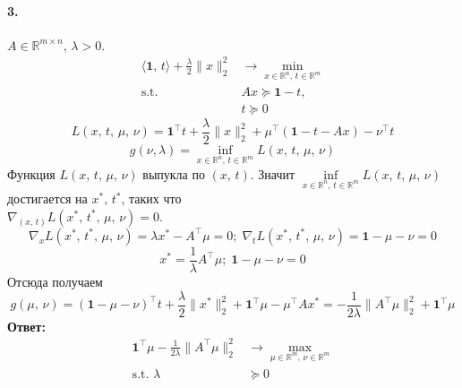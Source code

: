 \documentclass{article}
\newcommand*{\R}{\mathbb{R}}
\newcommand*{\st}{\text{s.t. }}
\newcommand*{\1}{\mathbf{1}}
\begin{document}
\paragraph{3.} $ A \in \R^{m \times n},\, \lambda > 0. $
\[ \begin{split}
    \langle \1,\, t \rangle + \frac{\lambda}{2} \|x\|_2^2 &\to \min\limits_{x \in \R^n,\, t \in \R^m} \\
    \st & Ax \succeq \1 - t, \\
    & t \succeq 0
\end{split} \]
\[ L(x,\, t,\, \mu,\, \nu) = \1^\top t + \frac{\lambda}{2} \|x\|_2^2 + \mu^\top \left( \1 - t - Ax \right) - \nu^\top t \]
\[ g(\nu, \lambda) = \inf\limits_{x \in \R^n,\, t \in \R^m} L(x,\, t,\, \mu,\, \nu) \]
Функция $L(x,\, t,\, \mu,\, \nu)$ выпукла по $(x,\, t)$. Значит $\inf\limits_{x \in \R^n,\, t \in \R^m} L(x,\, t,\, \mu,\, \nu)$ достигается на $x^\ast,\, t^\ast$, таких что \\ $\nabla_{(x,\, t)} L(x^\ast,\, t^\ast,\, \mu,\, \nu) = 0$.
\[ \nabla_x L(x^\ast,\, t^\ast,\, \mu,\, \nu) = \lambda x^\ast - A^\top \mu = 0;\; \nabla_t L(x^\ast,\, t^\ast,\, \mu,\, \nu) = \1 - \mu - \nu = 0 \]
\[ x^\ast = \frac{1}{\lambda} A^\top \mu;\; \1 - \mu - \nu = 0 \]
Отсюда получаем
\[ g(\mu,\, \nu) = (\1 - \mu - \nu)^\top t + \frac{\lambda}{2} \| x^\ast \|_2^2 + \1^\top \mu - \mu^\top A x^\ast = -\frac{1}{2\lambda} \| A^\top \mu \|_2^2 + \1^\top \mu \]
\textbf{Ответ:}
\[ \begin{split}
    \1^\top \mu - \frac{1}{2\lambda} \| A^\top \mu \|_2^2 &\to \max\limits_{\mu \in \R^m,\, \nu \in \R^m} \\
    \st \lambda &\succeq 0
\end{split} \]
\end{document}

